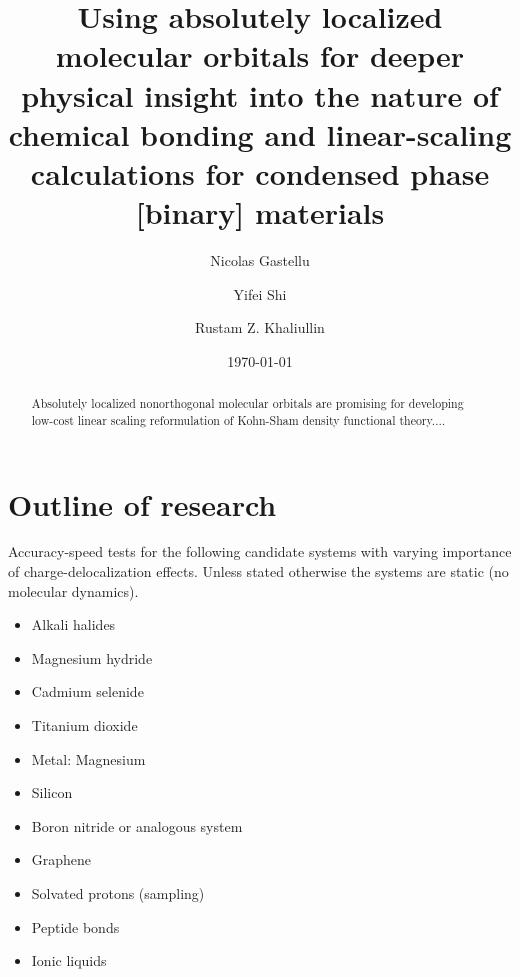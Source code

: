 \documentclass[aps,prb,twocolumn,amsmath,amssymb,superscriptaddress,longbibliography]{revtex4-1}
\begin{document}
\title{
Using absolutely localized molecular orbitals for deeper physical insight into the nature of chemical bonding and linear-scaling calculations for condensed phase [binary] materials 
}

\author{Nicolas Gastellu}
\author{Yifei Shi}
\author{Rustam Z. Khaliullin}

\date{\today}

\begin{abstract}
Absolutely localized nonorthogonal molecular orbitals are promising for developing low-cost linear scaling reformulation of Kohn-Sham density functional theory.$\ldots$
\end{abstract}

\maketitle
 
\section{Outline of research}

Accuracy-speed tests for the following candidate systems with varying importance of charge-delocalization effects. 
Unless stated otherwise the systems are static (no molecular dynamics).

\begin{itemize}
\item Alkali halides
\item Magnesium hydride
\item Cadmium selenide
\item Titanium dioxide
\item Metal: Magnesium
\item Silicon
\item Boron nitride or analogous system
\item Graphene
\item Solvated protons (sampling)
\item Peptide bonds
\item Ionic liquids
\end{itemize}
\end{document}
